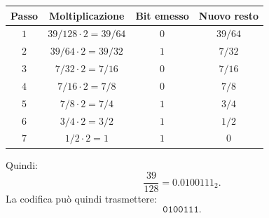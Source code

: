 \documentclass{article}
\theoremstyle{definition}
\numberwithin{equation}{section}
\begin{document}
\begin{center}
    \begin{tabular}{|c|c|c|c|}
        \hline
        \textbf{Passo} & \textbf{Moltiplicazione} & \textbf{Bit emesso} & \textbf{Nuovo resto} \\ \hline
        $1$            & $39/128\cdot 2=39/64$    & $0$                 & $39/64$              \\ \hline
        $2$            & $39/64\cdot 2=39/32$     & $1$                 & $7/32$               \\ \hline
        $3$            & $7/32\cdot 2=7/16$       & $0$                 & $7/16$               \\ \hline
        $4$            & $7/16\cdot 2=7/8$        & $0$                 & $7/8$                \\ \hline
        $5$            & $7/8\cdot 2=7/4$         & $1$                 & $3/4$                \\ \hline
        $6$            & $3/4\cdot 2=3/2$         & $1$                 & $1/2$                \\ \hline
        $7$            & $1/2\cdot 2=1$           & $1$                 & $0$                  \\ \hline
    \end{tabular}
\end{center}
Quindi:
\[
    \frac{39}{128}
    =
    0.0100111_2.
\]
La codifica può quindi trasmettere:
\[
    \texttt{0100111}.
\]
\end{document}
